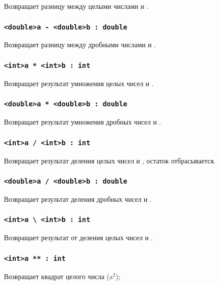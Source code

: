\documentclass[a4paper, 14pt]{extarticle}
\begin{document}
Возвращает разницу между целыми числами  и .

\subsubsection{\lstinline`<double>a - <double>b : double`}

Возвращает разницу между дробными числами  и .

\subsubsection{\lstinline`<int>a * <int>b : int`}

Возвращает результат умножения целых чисел  и .

\subsubsection{\lstinline`<double>a * <double>b : double`}

Возвращает результат умножения дробных чисел  и .

\subsubsection{\lstinline`<int>a / <int>b : int`}

Возвращает результат деления целых чисел  и , остаток отбрасывается.

\subsubsection{\lstinline`<double>a / <double>b : double`}

Возвращает результат деления дробных чисел  и .

\subsubsection{\lstinline`<int>a \ <int>b : int`}

Возвращает результат от деления целых чисел  и .


\subsubsection{\lstinline`<int>a ** : int`}

Возвращает квадрат целого числа  (a$^2$);
\end{document}

